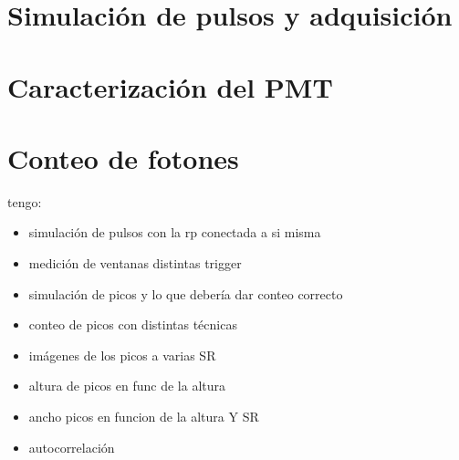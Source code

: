 \section{Simulación de pulsos y adquisición}
\section{Caracterización del PMT}
\section{Conteo de fotones}



tengo:

\begin{itemize}
    \item simulación de pulsos con la rp conectada a si misma
    \item medición de ventanas distintas trigger
    \item simulación de picos y lo que debería dar conteo correcto
    \item conteo de picos con distintas técnicas
    \item imágenes de los picos a varias SR
    \item altura de picos en func de la altura
    \item ancho picos en funcion de la altura Y SR
    \item autocorrelación
\end{itemize}